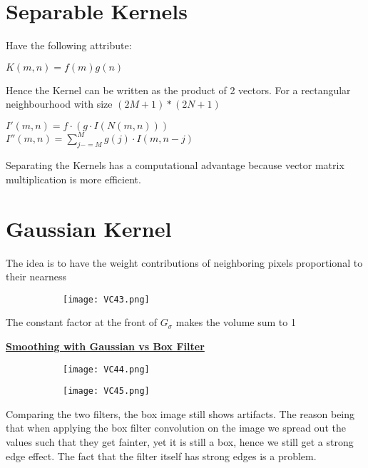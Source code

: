 \documentclass[8pt]{extreport}
\begin{document}
\section{Separable Kernels} Have the following attribute:
\begin{center}
$K(m,n) = f(m)g(n)$
\end{center}
Hence the Kernel can be written as the product of 2 vectors.  For a rectangular neighbourhood with size $(2M+1)\ast(2N+1)$
\begin{center}
$I'(m,n) = f \cdot (g \cdot I(N(m,n)))$\\
$I''(m,n) = \displaystyle\sum_{j-=M}^M g(j)\cdot I(m,n-j)$
\end{center}
Separating the Kernels has a computational advantage because vector matrix multiplication is more efficient.
\section{Gaussian Kernel}
The idea is to have the weight contributions of neighboring pixels proportional to their nearness
\begin{figure}[H]
\centering
\begin{subfigure}[b]{0.32\linewidth}
\texttt{[image: VC43.png]}
\end{subfigure}
\end{figure}
The constant factor at the front of $G_{\sigma}$ makes the volume sum to 1

\underline{\textbf{Smoothing with Gaussian vs Box Filter}  }
\begin{figure}[H]
\centering
\begin{subfigure}[b]{0.32\linewidth}
\texttt{[image: VC44.png]}
\end{subfigure}
\begin{subfigure}[b]{0.32\linewidth}
\texttt{[image: VC45.png]}
\end{subfigure}
\end{figure}
Comparing the two filters, the box image still shows artifacts. The reason being that when applying the box filter convolution on the image we spread out the values such that they get fainter, yet it is still a box, hence we still get a strong edge effect. The fact that the filter itself has strong edges is a problem.
\end{document}
